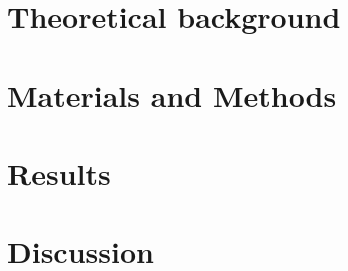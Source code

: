 \documentclass{article}
\author{Ignacio Martinez Vazquez}
\date{}
\begin{document}

\tableofcontents
\listoffigures


\part{Theoretical background}






\part{Materials and Methods}


\part{Results}


\part{Discussion}



%
%
\printbibliography
\end{document}
